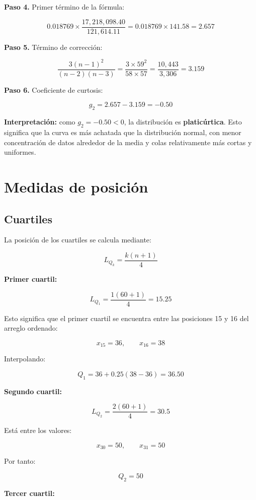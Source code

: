 \documentclass[12pt,letterpaper]{article}
\begin{document}
\textbf{Paso 4.} Primer término de la fórmula:

\[
0.018769 \times \frac{17{,}218{,}098.40}{121{,}614.11}
= 0.018769 \times 141.58
= 2.657
\]

\textbf{Paso 5.} Término de corrección:

\[
\frac{3(n-1)^2}{(n-2)(n-3)}
= \frac{3 \times 59^2}{58 \times 57}
= \frac{10{,}443}{3{,}306}
= 3.159
\]

\textbf{Paso 6.} Coeficiente de curtosis:

\[
\boxed{g_2 = 2.657 - 3.159 = -0.50}
\]

\textbf{Interpretación:} como $g_2 = -0.50 < 0$, la distribución es \textbf{platicúrtica}. Esto significa que la curva es más achatada que la distribución normal, con menor concentración de datos alrededor de la media y colas relativamente más cortas y uniformes.

\section{Medidas de posición}

\subsection{Cuartiles}

La posición de los cuartiles se calcula mediante:

\[
L_{Q_k}=\frac{k(n+1)}{4}
\]

\textbf{Primer cuartil:}

\[
L_{Q_1}=\frac{1(60+1)}{4}=15.25
\]

Esto significa que el primer cuartil se encuentra entre las posiciones 15 y 16 del arreglo ordenado:

\[
x_{15}=36,\qquad x_{16}=38
\]

Interpolando:

\[
Q_1=36+0.25(38-36)=36.50
\]

\textbf{Segundo cuartil:}

\[
L_{Q_2}=\frac{2(60+1)}{4}=30.5
\]

Está entre los valores:

\[
x_{30}=50,\qquad x_{31}=50
\]

Por tanto:

\[
Q_2=50
\]

\textbf{Tercer cuartil:}
\end{document}
